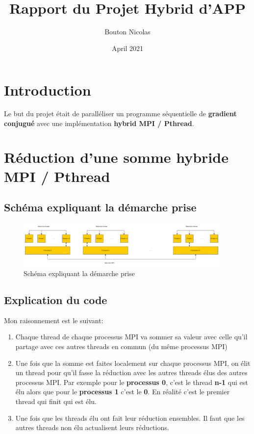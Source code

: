 \documentclass[12pt, letterpaper]{article}
\author{Bouton Nicolas}
\date{April 2021}
\title{Rapport du Projet Hybrid d'APP}
\begin{document}
\maketitle
\tableofcontents


\section{Introduction}
\label{sec:org650ad16}

Le but du projet était de paralléliser un programme séquentielle de \textbf{gradient
conjugué} avec une implémentation \textbf{hybrid MPI / Pthread}.

\section{Réduction d'une somme hybride MPI / Pthread}
\label{sec:org623c687}
\subsection{Schéma expliquant la démarche prise}
\label{sec:org3ae3fff}

\begin{figure}[htbp]
\centering
\includegraphics[width=400px]{../ressources/hyb_reduc.png}
\caption{\label{fig:orgcaec86e}Schéma expliquant la démarche prise}
\end{figure}

\subsection{Explication du code}
\label{sec:org0f29d12}

Mon raisonnement est le suivant:
\begin{enumerate}
\item Chaque thread de chaque processus MPI va sommer sa valeur avec celle qu'il
partage avec ces autres threads en commun (du même processus MPI)
\item Une fois que la somme est faites localement sur chaque processus MPI, on
élit un thread pour qu'il fasse la réduction avec les autres threads élus
des autres processus MPI. Par exemple pour le \textbf{processus 0}, c'est le
thread \textbf{n-1} qui est élu alors que pour le \textbf{processus 1} c'est le \textbf{0}. En
réalité c'est le premier thread qui finit qui est élu.
\item Une fois que les threads élu ont fait leur réduction ensembles. Il faut
que les autres threads non élu actualisent leurs réductions.
\end{enumerate}
\end{document}
